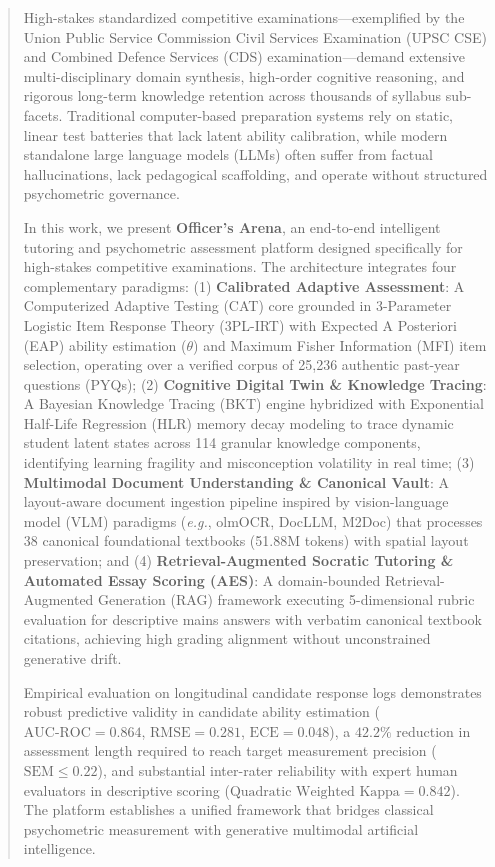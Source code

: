 \documentclass[conference]{IEEEtran}
\begin{document}
\begin{abstract}
High-stakes standardized competitive examinations---exemplified by the Union Public Service Commission Civil Services Examination (UPSC CSE) and Combined Defence Services (CDS) examination---demand extensive multi-disciplinary domain synthesis, high-order cognitive reasoning, and rigorous long-term knowledge retention across thousands of syllabus sub-facets. Traditional computer-based preparation systems rely on static, linear test batteries that lack latent ability calibration, while modern standalone large language models (LLMs) often suffer from factual hallucinations, lack pedagogical scaffolding, and operate without structured psychometric governance.

In this work, we present \textbf{Officer's Arena}, an end-to-end intelligent tutoring and psychometric assessment platform designed specifically for high-stakes competitive examinations. The architecture integrates four complementary paradigms:
(1) \textbf{Calibrated Adaptive Assessment}: A Computerized Adaptive Testing (CAT) core grounded in 3-Parameter Logistic Item Response Theory (3PL-IRT) with Expected A Posteriori (EAP) ability estimation ($\theta$) and Maximum Fisher Information (MFI) item selection, operating over a verified corpus of 25,236 authentic past-year questions (PYQs);
(2) \textbf{Cognitive Digital Twin \& Knowledge Tracing}: A Bayesian Knowledge Tracing (BKT) engine hybridized with Exponential Half-Life Regression (HLR) memory decay modeling to trace dynamic student latent states across 114 granular knowledge components, identifying learning fragility and misconception volatility in real time;
(3) \textbf{Multimodal Document Understanding \& Canonical Vault}: A layout-aware document ingestion pipeline inspired by vision-language model (VLM) paradigms (\textit{e.g.}, olmOCR, DocLLM, M2Doc) that processes 38 canonical foundational textbooks (51.88M tokens) with spatial layout preservation; and
(4) \textbf{Retrieval-Augmented Socratic Tutoring \& Automated Essay Scoring (AES)}: A domain-bounded Retrieval-Augmented Generation (RAG) framework executing 5-dimensional rubric evaluation for descriptive mains answers with verbatim canonical textbook citations, achieving high grading alignment without unconstrained generative drift.

Empirical evaluation on longitudinal candidate response logs demonstrates robust predictive validity in candidate ability estimation ($\text{AUC-ROC} = 0.864$, $\text{RMSE} = 0.281$, $\text{ECE} = 0.048$), a $42.2\%$ reduction in assessment length required to reach target measurement precision ($\text{SEM} \le 0.22$), and substantial inter-rater reliability with expert human evaluators in descriptive scoring ($\text{Quadratic Weighted Kappa} = 0.842$). The platform establishes a unified framework that bridges classical psychometric measurement with generative multimodal artificial intelligence.
\end{abstract}
\end{document}

